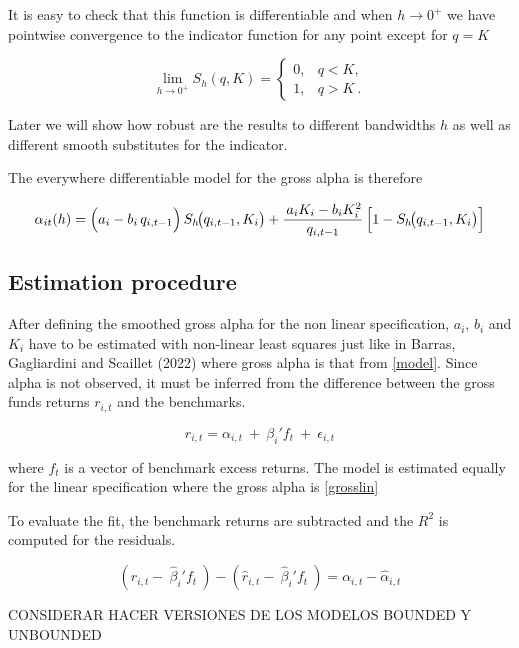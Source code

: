 \documentclass[12pt]{article}
\let\orgautoref\autoref
\renewcommand{\autoref}[1]{\def\equationautorefname{Eq.}\orgautoref{#1}}
\begin{document}
It is easy to check that this function is differentiable and when $h\to 0^+$ we have pointwise convergence to the indicator function for any point except for $q=K$

\[
\lim_{h\to 0^+} S_h(q,K)=
\begin{cases}
0, & q<K,\\[4pt]
1, & q>K~.
\end{cases}
\]

\par
Later we will show how robust are the results to different bandwidths $h$ as well as different smooth substitutes for the indicator.

The everywhere differentiable model for the gross alpha is therefore

\begin{equation}
    \alpha_{it}(h)=
   \Bigl(a_i - b_i\,q_{i,t-1}\Bigr)\,
      S_h\!\bigl(q_{i,t-1},K_i\bigr)
      + \frac{\,a_i K_i - b_i K_i^{2}}{q_{i,t-1}}\,
        \Bigl[1-S_h\!\bigl(q_{i,t-1},K_i\bigr)\Bigr]
%
\end{equation}


\subsection{Estimation procedure}
After defining the smoothed gross alpha for the non linear specification, $a_i$, $b_i$ and $K_i$ have to be estimated with non-linear least squares just like in Barras, Gagliardini and Scaillet (2022)\cite{BarrasGagliardiniScaillet2021} where gross alpha is that from \autoref{model}. Since alpha is not observed, it must be inferred from the difference between the gross funds returns $r_{i,t}$ and the benchmarks.

\begin{equation}
    r_{i,t}= \alpha_{i,t} \ +\ \beta_i'f_t \ +\ \epsilon_{i,t}
\end{equation}

where $f_t$ is a vector of benchmark excess returns. The model is estimated equally for the linear specification where the gross alpha is \autoref{grosslin} 

To evaluate the fit, the benchmark returns are subtracted and the $R^2$ is computed for the residuals.

$$
    (r_{i,t} -\ \hat{\beta}_i'f_t \ )-(\hat{r}_{i,t} -\ \hat{\beta}_i'f_t \ )= \alpha_{i,t}- \hat{\alpha}_{i,t}
$$




CONSIDERAR HACER VERSIONES DE LOS MODELOS BOUNDED Y UNBOUNDED 
\end{document}
